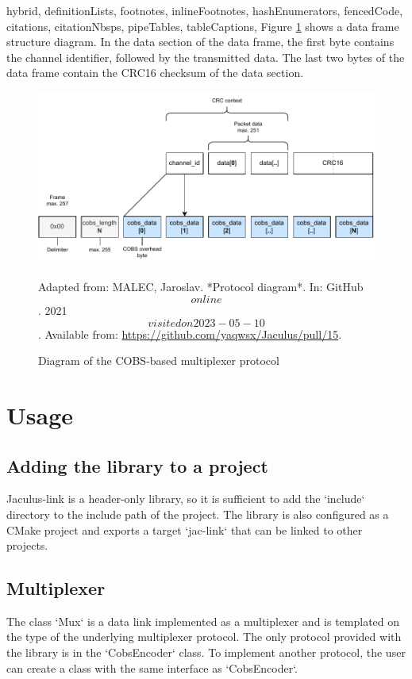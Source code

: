 \begin{markdown*}{%
  hybrid,
  definitionLists,
  footnotes,
  inlineFootnotes,
  hashEnumerators,
  fencedCode,
  citations,
  citationNbsps,
  pipeTables,
  tableCaptions,
}
Figure \ref{fig:cobs-diagram} shows a data frame structure diagram. In the data section of the data frame, the first byte contains the channel identifier, followed by the transmitted data. The last two bytes of the data frame contain the CRC16 checksum of the data section.


\begin{figure}[!ht]
    \centering
    \includegraphics[width=\textwidth]{img/cobs-diagram}
    \caption{Diagram of the COBS-based multiplexer protocol}
    \small{Adapted from: MALEC, Jaroslav. *Protocol diagram*. In: GitHub \[online\]. 2021 \[visited on 2023-05-10\]. Available from: \url{https://github.com/yaqwsx/Jaculus/pull/15}.}
    \label{fig:cobs-diagram}
\end{figure}


\section{Usage}

\subsection{Adding the library to a project}

Jaculus-link is a header-only library, so it is sufficient to add the `include` directory to the include path of the project. The library is also configured as a CMake project and exports a target `jac-link` that can be linked to other projects.

\subsection{Multiplexer}

The class `Mux` is a data link implemented as a multiplexer and is templated on the type of the underlying multiplexer protocol. The only protocol provided with the library is in the `CobsEncoder` class. To implement another protocol, the user can create a class with the same interface as `CobsEncoder`.


\end{markdown*}
